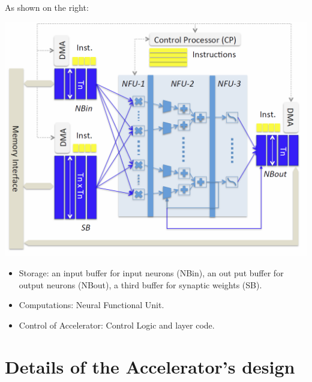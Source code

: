 \documentclass[10pt]{article}
\begin{document}
    As shown on the right:
    \begin{marginfigure}
        \includegraphics[width=\marginparwidth]{composition.png}
    \end{marginfigure}
    \begin{itemize}
        \item Storage: an input buffer for input neurons (NBin), an out
        put buffer for output neurons (NBout), a third buffer for
        synaptic weights (SB).
        \item Computations: Neural Functional Unit.
        \item Control of Accelerator: Control Logic and  layer code.
    \end{itemize}
    \part{Details of the Accelerator's design}
\end{document}
